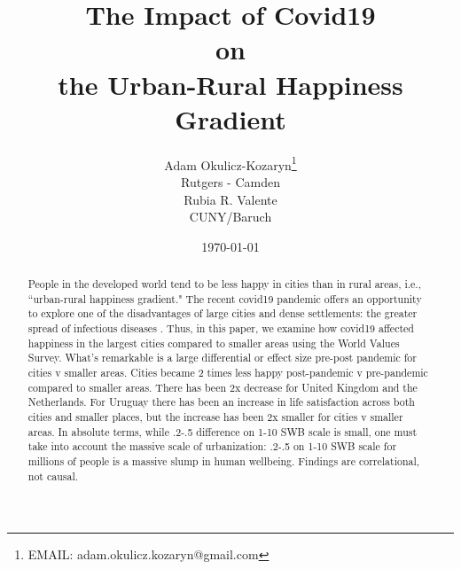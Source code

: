 \documentclass[10pt, letterpaper]{article}
\date{{}\today \hspace{.2in}\xxivtime}
\title{  %
  The Impact of Covid19\\ on\\ the Urban-Rural Happiness Gradient
}
\author{
Adam Okulicz-Kozaryn\thanks{EMAIL: adam.okulicz.kozaryn@gmail.com
} \\
{\small Rutgers - Camden  %
}\\
Rubia R. Valente\\
{\small CUNY/Baruch}
}
\begin{document}


\maketitle
\vspace{-.4in}
\begin{center}

\end{center}


\begin{abstract}
  \noindent People in the developed world tend to be less happy in cities than
  in rural areas, i.e., ``urban-rural happiness gradient." The recent covid19
  pandemic offers an opportunity to explore one of the disadvantages of large
  cities and dense settlements: the greater spread of infectious diseases %
  . Thus, in this paper, we examine how covid19 affected happiness in the largest cities compared to smaller areas using the World Values Survey. What's remarkable is a large differential or effect size pre-post pandemic for cities v smaller areas.  Cities  became 2 times less happy post-pandemic v pre-pandemic compared to smaller areas. There has been 2x decrease for United Kingdom and the Netherlands.  For Uruguay there has been an increase in
 life satisfaction across both cities and smaller places, but the increase has been 2x smaller for cities v smaller areas. %
 In absolute terms, %
 while .2-.5 difference on 1-10 SWB scale is small, one must take into account the massive scale of
 urbanization: .2-.5  on 1-10 SWB scale for millions of people is a massive slump in human wellbeing. Findings are correlational, not causal. 
\end{abstract}
\vspace{.15in} 
\vspace{.25in} 
\end{document}
